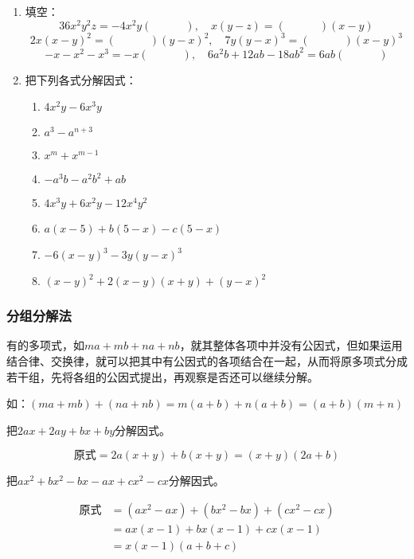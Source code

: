 \begin{ex}
\begin{enumerate}
    \item 填空：
\[36x^2y^2z=-4x^2y(\qquad\quad),\quad x(y-z)=(\qquad\quad)(x-y)  \]
\[2x(x-y)^2=(\qquad\quad)(y-x)^2,\quad 7y(y-x)^3=(\qquad\quad)(x-y)^3\]
\[-x-x^2-x^3=-x(\quad\qquad),\quad 6a^2b+12ab-18ab^2=6ab(\quad\qquad)\]

\item 把下列各式分解因式：
\begin{enumerate}
    \item $4x^2y-6x^3y$
    \item $a^3-a^{n+3}$
    \item $x^m+x^{m-1}$
    \item $-a^3b-a^2b^2+ab$
    \item $4x^3y+6x^2y-12x^4y^2$
    \item $a(x-5)+b(5-x)-c(5-x)$
    \item $-6(x-y)^3-3y(y-x)^3$
    \item $(x-y)^2+2(x-y)(x+y)+(y-x)^2$
\end{enumerate}
\end{enumerate}
\end{ex}

\subsubsection{分组分解法}
有的多项式，如$ma+mb+na+nb$，就其整体各项中并没有公因式，但如果运用结合律、交换律，就可以把其中有公因式的各项结合在一起，从而将原多项式分成若干组，先将各组的公因式提出，再观察是否还可以继续分解。

如：$(ma+mb)+(na+nb)=m(a+b)+n(a+b)=(a+b)(m+n)$

\begin{example}
    把$2ax+2ay+bx+by$分解因式。
\end{example}

\begin{solution}
    \[\text{原式}=2a(x+y)+b(x+y)
    = (x+y) (2a+b)\]
\end{solution}

\begin{example}
    把$ax^2+bx^2-bx-ax+cx^2-cx$分解因式。
\end{example}

\begin{solution}
\[\begin{split}
    \text{原式}&=(ax^2-ax)+(bx^2-bx)+(cx^2-cx)\\
&=ax (x-1) +bx (x-1) +cx (x-1)\\
&=x (x-1) (a+b+c)
\end{split}\]    
\end{solution}

